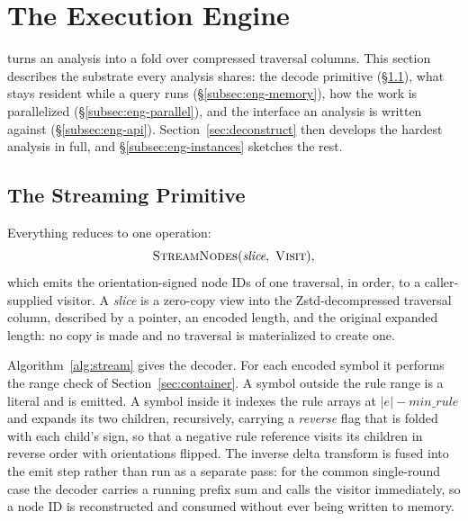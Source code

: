 \section{The Execution Engine}
\label{sec:engine}

\sys turns an analysis into a fold over compressed traversal columns. This
section describes the substrate every analysis shares: the decode primitive
(\S\ref{subsec:eng-stream}), what stays resident while a query runs
(\S\ref{subsec:eng-memory}), how the work is parallelized
(\S\ref{subsec:eng-parallel}), and the interface an analysis is written against
(\S\ref{subsec:eng-api}). Section~\ref{sec:deconstruct} then develops the hardest
analysis in full, and \S\ref{subsec:eng-instances} sketches the rest.

\subsection{The Streaming Primitive}
\label{subsec:eng-stream}

Everything reduces to one operation:
\[
  \textsc{StreamNodes}(\textit{slice},\ \textsc{Visit}),
\]
which emits the orientation-signed node IDs of one traversal, in order, to a
caller-supplied visitor. A \textit{slice} is a zero-copy view into the
Zstd-decompressed traversal column, described by a pointer, an encoded length, and
the original expanded length: no copy is made and no traversal is materialized to
create one.

Algorithm~\ref{alg:stream} gives the decoder. For each encoded symbol it performs
the range check of Section~\ref{sec:container}. A symbol outside the rule range is
a literal and is emitted. A symbol inside it indexes the rule arrays at
$|e| - \textit{min\_rule}$ and expands its two children, recursively, carrying a
\emph{reverse} flag that is folded with each child's sign, so that a negative rule
reference visits its children in reverse order with orientations flipped. The
inverse delta transform is fused into the emit step rather than run as a separate
pass: for the common single-round case the decoder carries a running prefix sum
and calls the visitor immediately, so a node ID is reconstructed and consumed
without ever being written to memory.

